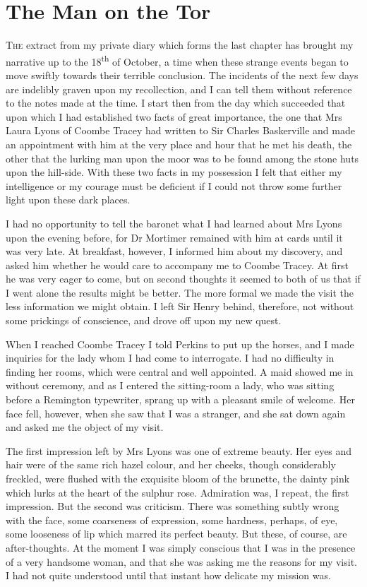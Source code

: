 \chapter{The Man on the Tor}
\lettrine[lines=4]{T}{he} extract from my private diary which forms the last chap\-ter has brought my narrative up to the 18\textsuperscript{th} of October, a time when these strange events began to move swiftly towards their terrible conclusion. The incidents of the next few days are indelibly graven upon my recollection, and I can tell them without reference to the notes made at the time. I start then from the day which succeeded that upon which I had established two facts of great importance, the one that Mrs Laura Lyons of Coombe Tracey had written to Sir Charles Baskerville and made an appointment with him at the very place and hour that he met his death, the other that the lurking man upon the moor was to be found among the stone huts upon the hill-side. With these two facts in my possession I felt that either my intelligence or my courage must be deficient if I could not throw some further light upon these dark places.

I had no opportunity to tell the baronet what I had learned about Mrs Lyons upon the evening before, for Dr Mortimer remained with him at cards until it was very late. At breakfast, however, I informed him about my discovery, and asked him whether he would care to accompany me to Coombe Tracey. At first he was very eager to come, but on second thoughts it seemed to both of us that if I went alone the results might be better. The more formal we made the visit the less information we might obtain. I left Sir Henry behind, therefore, not without some prickings of conscience, and drove off upon my new quest.

When I reached Coombe Tracey I told Perkins to put up the horses, and I made inquiries for the lady whom I had come to interrogate. I had no difficulty in finding her rooms, which were central and well appointed. A maid showed me in without ceremony, and as I entered the sitting-room a lady, who was sitting before a Remington typewriter, sprang up with a pleasant smile of welcome. Her face fell, however, when she saw that I was a stranger, and she sat down again and asked me the object of my visit.

The first impression left by Mrs Lyons was one of extreme beau\-ty. Her eyes and hair were of the same rich hazel colour, and her cheeks, though considerably freckled, were flushed with the exquisite bloom of the brunette, the dainty pink which lurks at the heart of the sulphur rose. Admiration was, I repeat, the first impression. But the second was criticism. There was something subtly wrong with the face, some coarseness of expression, some hardness, perhaps, of eye, some looseness of lip which marred its perfect beauty. But these, of course, are after-thoughts. At the moment I was simply conscious that I was in the presence of a very handsome woman, and that she was asking me the reasons for my visit. I had not quite understood until that instant how delicate my mission was.


